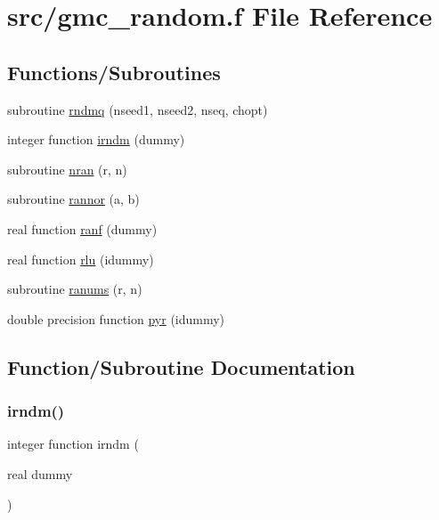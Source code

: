 \hypertarget{gmc__random_8f}{}\section{src/gmc\+\_\+random.f File Reference}
\label{gmc__random_8f}
\subsection*{Functions/\+Subroutines}
\begin{DoxyCompactItemize}
\item 
subroutine \hyperlink{gmc__random_8f_a9f7e299636d9aa908be5751ad6cc3b3f}{rndmq} (nseed1, nseed2, nseq, chopt)
\item 
integer function \hyperlink{gmc__random_8f_a45e4beabe1a9d7d06f7e8dd11de2bb40}{irndm} (dummy)
\item 
subroutine \hyperlink{gmc__random_8f_a7b1dcdac0dcede17363f3378f1d37760}{nran} (r, n)
\item 
subroutine \hyperlink{gmc__random_8f_a3da8efd8c2842ba8d47569f6bec2e989}{rannor} (a, b)
\item 
real function \hyperlink{gmc__random_8f_a1b59c2860c681ba2938e38284ff3ae3d}{ranf} (dummy)
\item 
real function \hyperlink{gmc__random_8f_acbbdf0219bb77063d42c5ead04a95992}{rlu} (idummy)
\item 
subroutine \hyperlink{gmc__random_8f_a2257c5764d872d6d6d31f0266aa08635}{ranums} (r, n)
\item 
double precision function \hyperlink{gmc__random_8f_adc1905efb1ff6d967d69f6823feb5e92}{pyr} (idummy)
\end{DoxyCompactItemize}


\subsection{Function/\+Subroutine Documentation}
\mbox{\label{gmc__random_8f_a45e4beabe1a9d7d06f7e8dd11de2bb40}} 
\subsubsection{\texorpdfstring{irndm()}{irndm()}}
{\footnotesize\ttfamily integer function irndm (\begin{DoxyParamCaption}\item[{real}]{dummy }\end{DoxyParamCaption})}

